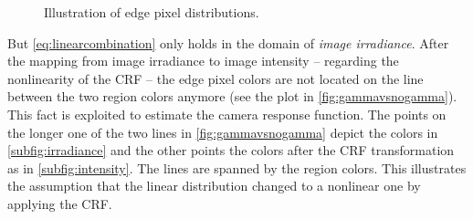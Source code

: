 \begin{figure}[tbp]
  \centering
  \caption[Illustration of edge pixel distributions]{Illustration of edge pixel distributions.}
  \label{fig:illustrationedgenonlinearity}
\end{figure}

But \autoref{eq:linearcombination} only holds in the domain of \emph{image irradiance}. After the mapping from image irradiance to image intensity -- regarding the nonlinearity of the CRF -- the edge pixel colors are not located on the line between the two region colors anymore (see the plot in \autoref{fig:gammavsnogamma}). This fact is exploited to estimate the camera response function. The points on the longer one of the two lines in \autoref{fig:gammavsnogamma} depict the colors in \autoref{subfig:irradiance} and the other points the colors after the CRF transformation as in \autoref{subfig:intensity}. The lines are spanned by the region colors. This illustrates the assumption that the linear distribution changed to a nonlinear one by applying the CRF. 


